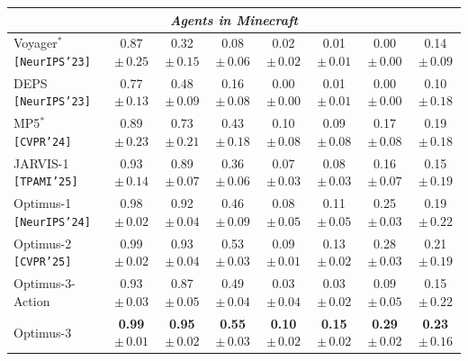 \begin{table}[htbp]
{\begin{tabular}{lccccccc}
\hline
\multicolumn{8}{c}{\textit{Agents in Minecraft}} \\
\hline
Voyager$^{*}$ \cite{wang2023describe}    \texttt{[NeurIPS'23]}    &  0.87$\scriptstyle\pm\,0.25$   &  0.32$\scriptstyle\pm\,0.15$    &   0.08$\scriptstyle\pm\,0.06$   &  0.02$\scriptstyle\pm\,0.02$    &   0.01$\scriptstyle\pm\,0.01$      &   0.00$\scriptstyle\pm\,0.00$       &   0.14$\scriptstyle\pm\,0.09$           \\
DEPS \cite{wang2023describe}    \texttt{[NeurIPS'23]}     &  0.77$\scriptstyle\pm\,0.13$   &  0.48$\scriptstyle\pm\,0.09$    &   0.16$\scriptstyle\pm\,0.08$   &  0.00$\scriptstyle\pm\,0.00$    &   0.01$\scriptstyle\pm\,0.01$      &   0.00$\scriptstyle\pm\,0.00$       &   0.10$\scriptstyle\pm\,0.18$           \\
MP5$^{*}$ \cite{qin2023mp5}    \texttt{[CVPR'24]}     &  0.89$\scriptstyle\pm\,0.23$   &  0.73$\scriptstyle\pm\,0.21$    &   0.43$\scriptstyle\pm\,0.18$   &  0.10$\scriptstyle\pm\,0.08$    &   0.09$\scriptstyle\pm\,0.08$      &   0.17$\scriptstyle\pm\,0.08$       &   0.19$\scriptstyle\pm\,0.18$           \\
JARVIS-1 \cite{wang2023jarvis}    \texttt{[TPAMI'25]}  &  0.93$\scriptstyle\pm\,0.14$   &    0.89$\scriptstyle\pm\,0.07$   &  0.36$\scriptstyle\pm\,0.06$    &  0.07$\scriptstyle\pm\,0.03$    &    0.08$\scriptstyle\pm\,0.03$    &     0.16$\scriptstyle\pm\,0.07$     &   0.15$\scriptstyle\pm\,0.19$            \\
Optimus-1 \cite{li2024optimus}  \texttt{[NeurIPS'24]}  &  0.98$\scriptstyle\pm\,0.02$   & 0.92$\scriptstyle\pm\,0.04$    & 0.46$\scriptstyle\pm\,0.09$    &   0.08$\scriptstyle\pm\,0.05$  &     0.11$\scriptstyle\pm\,0.05$   &   0.25$\scriptstyle\pm\,0.03$    &   0.19$\scriptstyle\pm\,0.22$          \\ 
Optimus-2 \cite{li2025optimus}   \texttt{[CVPR'25]}   & 0.99$\scriptstyle\pm\,0.02$   & 0.93$\scriptstyle\pm\,0.04$    & 0.53$\scriptstyle\pm\,0.03$   &   0.09$\scriptstyle\pm\,0.01$  &   0.13$\scriptstyle\pm\,0.02$    &    0.28$\scriptstyle\pm\,0.03$   &   0.21$\scriptstyle\pm\,0.19$   \\ 
\hline
\rowcolor[HTML]{E7EEFE}
Optimus-3-Action      &    0.93$\scriptstyle\pm\,0.03$ & 0.87$\scriptstyle\pm\,0.05$      &  0.49$\scriptstyle\pm\,0.04$   &  0.03$\scriptstyle\pm\,0.04$  &  0.03$\scriptstyle\pm\,0.02$      &   0.09$\scriptstyle\pm\,0.05$     &   0.15$\scriptstyle\pm\,0.22$  \\
\rowcolor[HTML]{E7EEFE}
Optimus-3      &    \textbf{0.99$\scriptstyle\pm\,0.01$} & \textbf{0.95$\scriptstyle\pm\,0.02$}      &  \textbf{0.55$\scriptstyle\pm\,0.03$}   &  \textbf{0.10$\scriptstyle\pm\,0.02$}  &  \textbf{0.15$\scriptstyle\pm\,0.02$}      &   \textbf{0.29$\scriptstyle\pm\,0.02$}     &   \textbf{0.23$\scriptstyle\pm\,0.16$}  \\


\bottomrule[1.2pt]
\end{tabular}
\vspace{-5pt}
}

\end{table}





